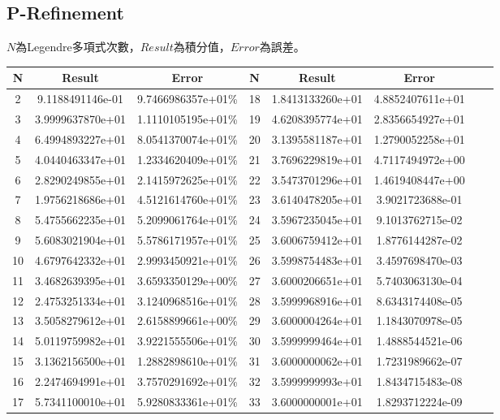 \documentclass[a4paper,12pt]{article}
\begin{document}
\subsection{P-Refinement}
$N$為Legendre多項式次數，$Result$為積分值，$Error$為誤差。
\begin{longtable}{|c|c|c|c|c|c|c|c|}
    \hline
    N & Result & Error & N & Result & Error\\
    \hline
    2 & 9.1188491146e-01 & 9.7466986357e+01\% & 18 & 1.8413133260e+01 & 4.8852407611e+01 \\
    \hline
    3 & 3.9999637870e+01 & 1.1110105195e+01\% & 19 & 4.6208395774e+01 & 2.8356654927e+01 \\
    \hline
    4 & 6.4994893227e+01 & 8.0541370074e+01\% & 20 & 3.1395581187e+01 & 1.2790052258e+01 \\
    \hline
    5 & 4.0440463347e+01 & 1.2334620409e+01\% & 21 & 3.7696229819e+01 & 4.7117494972e+00 \\
    \hline
    6 & 2.8290249855e+01 & 2.1415972625e+01\% & 22 & 3.5473701296e+01 & 1.4619408447e+00 \\
    \hline
    7 & 1.9756218686e+01 & 4.5121614760e+01\% & 23 & 3.6140478205e+01 & 3.9021723688e-01 \\
    \hline
    8 & 5.4755662235e+01 & 5.2099061764e+01\% & 24 & 3.5967235045e+01 & 9.1013762715e-02 \\
    \hline
    9 & 5.6083021904e+01 & 5.5786171957e+01\% & 25 & 3.6006759412e+01 & 1.8776144287e-02 \\
    \hline
    10 & 4.6797642332e+01 & 2.9993450921e+01\% & 26 & 3.5998754483e+01 & 3.4597698470e-03 \\
    \hline
    11 & 3.4682639395e+01 & 3.6593350129e+00\% & 27 & 3.6000206651e+01 & 5.7403063130e-04 \\
    \hline
    12 & 2.4753251334e+01 & 3.1240968516e+01\% & 28 & 3.5999968916e+01 & 8.6343174408e-05 \\
    \hline
    13 & 3.5058279612e+01 & 2.6158899661e+00\% & 29 & 3.6000004264e+01 & 1.1843070978e-05 \\
    \hline
    14 & 5.0119759982e+01 & 3.9221555506e+01\% & 30 & 3.5999999464e+01 & 1.4888544521e-06 \\
    \hline
    15 & 3.1362156500e+01 & 1.2882898610e+01\% & 31 & 3.6000000062e+01 & 1.7231989662e-07 \\
    \hline
    16 & 2.2474694991e+01 & 3.7570291692e+01\% & 32 & 3.5999999993e+01 & 1.8434715483e-08 \\
    \hline
    17 & 5.7341100010e+01 & 5.9280833361e+01\% & 33 & 3.6000000001e+01 & 1.8293712224e-09 \\
    \hline
    
\end{longtable}
\end{document}
